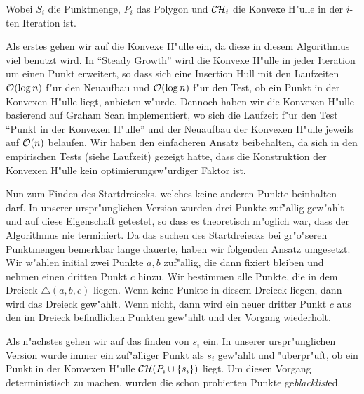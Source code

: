     Wobei $S_i$ die Punktmenge, $P_i$ das Polygon und $\mathcal{CH}_i$ die Konvexe H"ulle
    in der $i$-ten Iteration ist.

    Als erstes gehen wir auf die Konvexe H"ulle ein, da diese in diesem
    Algorithmus viel benutzt wird. In \enquote{Steady Growth} wird die Konvexe
    H"ulle in jeder Iteration um einen Punkt erweitert, so dass sich eine
    Insertion Hull mit den Laufzeiten $\mathcal{O}(\log n)$ f"ur den Neuaufbau und
    $\mathcal{O}(\log n)$ f"ur den Test, ob ein Punkt in der Konvexen H"ulle liegt,
    anbieten w"urde. Dennoch haben wir die Konvexen H"ulle basierend auf Graham
    Scan implementiert, wo sich die Laufzeit f"ur den Test \enquote{Punkt in der
    Konvexen H"ulle} und der Neuaufbau der Konvexen H"ulle jeweils auf
    $\mathcal{O}(n)$ belaufen. Wir haben den einfacheren Ansatz beibehalten, da sich
    in den empirischen Tests (siehe Laufzeit) gezeigt hatte, dass die
    Konstruktion der Konvexen H"ulle kein optimierungsw"urdiger Faktor ist.

    Nun zum Finden des Startdreiecks, welches keine anderen Punkte beinhalten
    darf. In unserer urspr"unglichen Version wurden drei Punkte zuf"allig
    gew"ahlt und auf diese Eigenschaft getestet, so dass es theoretisch m"oglich
    war, dass der Algorithmus nie terminiert. Da das suchen des Startdreiecks
    bei gr"o"seren Punktmengen bemerkbar lange dauerte, haben wir folgenden
    Ansatz umgesetzt. Wir w"ahlen initial zwei Punkte $a, b$ zuf"allig, die dann
    fixiert bleiben und nehmen einen dritten Punkt $c$ hinzu. Wir bestimmen alle
    Punkte, die in dem Dreieck $\triangle(a,b,c)$ liegen. Wenn keine Punkte in
    diesem Dreieck liegen, dann wird das Dreieck gew"ahlt. Wenn nicht, dann wird
    ein neuer dritter Punkt $c$ aus den im Dreieck befindlichen Punkten gew"ahlt
    und der Vorgang wiederholt.

    Als n"achstes gehen wir auf das finden von $s_i$ ein. In unserer
    urspr"unglichen Version wurde immer ein zuf"alliger Punkt als $s_i$ gew"ahlt
    und "uberpr"uft, ob ein Punkt in der Konvexen H"ulle $\mathcal{CH}(P_i \cup \{s_i\})$
    liegt. Um diesen Vorgang deterministisch zu machen, wurden die schon
    probierten Punkte ge\emph{blacklist}ed.

